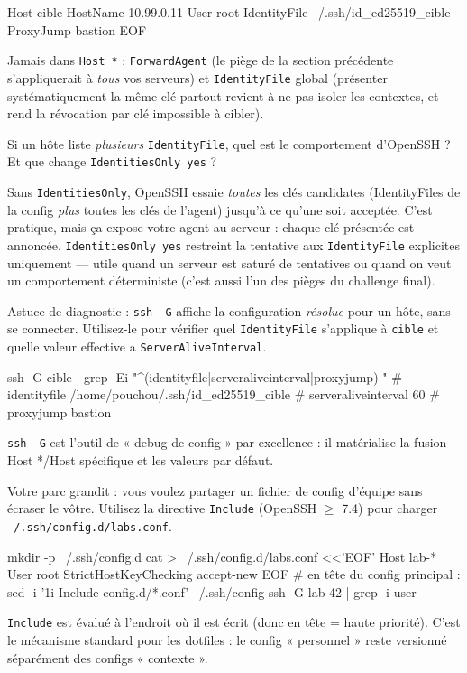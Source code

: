 \documentclass[a4paper,10pt]{exam}
\begin{document}
\begin{questions}
\begin{solution}
\begin{bashcode}
Host cible
    HostName 10.99.0.11
    User root
    IdentityFile ~/.ssh/id_ed25519_cible
    ProxyJump bastion
EOF
\end{bashcode}
Jamais dans \texttt{Host *} : \texttt{ForwardAgent} (le piège de la section précédente
s'appliquerait à \emph{tous} vos serveurs) et \texttt{IdentityFile} global (présenter
systématiquement la même clé partout revient à ne pas isoler les contextes, et rend la
révocation par clé impossible à cibler).
\end{solution}
\question Si un hôte liste \emph{plusieurs} \texttt{IdentityFile}, quel est le comportement
d'OpenSSH ? Et que change \texttt{IdentitiesOnly yes} ?
\begin{solution}
Sans \texttt{IdentitiesOnly}, OpenSSH essaie \emph{toutes} les clés candidates
(IdentityFiles de la config \emph{plus} toutes les clés de l'agent) jusqu'à ce qu'une
soit acceptée. C'est pratique, mais ça expose votre agent au serveur : chaque clé
présentée est annoncée. \texttt{IdentitiesOnly yes} restreint la tentative aux
\texttt{IdentityFile} explicites uniquement — utile quand un serveur est saturé de
tentatives ou quand on veut un comportement déterministe (c'est aussi l'un des pièges
du challenge final).
\end{solution}
\question Astuce de diagnostic : \texttt{ssh -G} affiche la configuration \emph{résolue}
pour un hôte, sans se connecter. Utilisez-le pour vérifier quel \texttt{IdentityFile}
s'applique à \texttt{cible} et quelle valeur effective a \texttt{ServerAliveInterval}.
\begin{solution}
\begin{bashcode}
ssh -G cible | grep -Ei "^(identityfile|serveraliveinterval|proxyjump) "
# identityfile /home/pouchou/.ssh/id_ed25519_cible
# serveraliveinterval 60
# proxyjump bastion
\end{bashcode}
\texttt{ssh -G} est l'outil de « debug de config » par excellence : il matérialise la
fusion Host */Host spécifique et les valeurs par défaut.
\end{solution}
\question Votre parc grandit : vous voulez partager un fichier de config d'équipe sans
écraser le vôtre. Utilisez la directive \texttt{Include} (OpenSSH $\geq$ 7.4) pour charger
\texttt{~/.ssh/config.d/labs.conf}.
\begin{solution}
\begin{bashcode}
mkdir -p ~/.ssh/config.d
cat > ~/.ssh/config.d/labs.conf <<'EOF'
Host lab-*
    User root
    StrictHostKeyChecking accept-new
EOF
# en tête du config principal :
sed -i '1i Include config.d/*.conf' ~/.ssh/config
ssh -G lab-42 | grep -i user
\end{bashcode}
\texttt{Include} est évalué à l'endroit où il est écrit (donc en tête = haute priorité).
C'est le mécanisme standard pour les dotfiles : le config « personnel » reste versionné
séparément des configs « contexte ».
\end{solution}
\end{questions}
\end{document}

